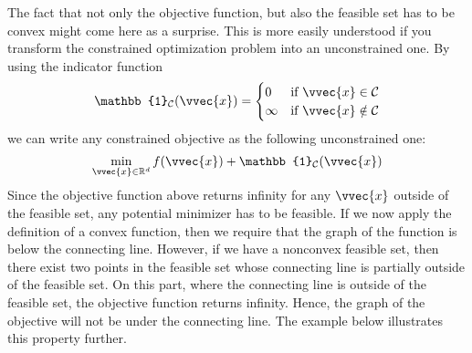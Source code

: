 \documentclass[letterpaper,10pt,english]{jupyterBook}
\begin{document}
\sphinxAtStartPar
The fact that not only the objective function, but also the feasible set has to be convex might come here as a surprise. This is more easily understood if you transform the constrained optimization problem into an unconstrained one. By using the indicator function
\begin{equation*}
\begin{split}\mathbb{1}_\mathcal{C}(\vvec{x})=\begin{cases}0 & \text{if }\vvec{x}\in\mathcal{C}\\ \infty& \text{if }\vvec{x}\notin\mathcal{C} \end{cases}\end{split}
\end{equation*}
we can write any constrained objective as the following unconstrained one:
\begin{align*}
\min_{\vvec{x}\in\mathbb{R}^d} f(\vvec{x}) +\mathbb{1}_\mathcal{C}(\vvec{x})
\end{align*}
\sphinxAtStartPar
Since the objective function above returns infinity for any \(\vvec{x}\) outside of the feasible set, any potential minimizer has to be feasible. If we now apply the definition of a convex function, then we require that the graph of the function is below the connecting line. However, if we have a nonconvex feasible set, then there exist two points in the feasible set whose connecting line is partially outside of the feasible set. On this part, where the connecting line is outside of the feasible set, the objective function returns infinity. Hence, the graph of the objective will not be under the connecting line. The example below illustrates this property further.
\label{optimization_convex:example-3}
\end{document}
